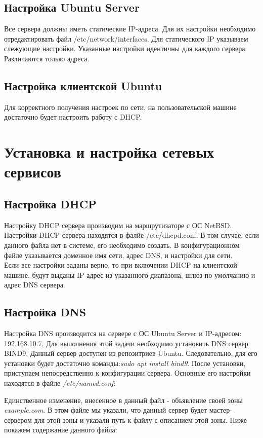 \subsection{Настройка Ubuntu Server}
Все сервера должны иметь статические IP-адреса. Для их настройки необходимо отредактировать файл /etc/network/interfaces. Для статического IP указываем слежующие настройки. Указанные настройки идентичны для каждого сервера. Различаются только адреса. 


\subsection{Настройка клиентской Ubuntu}
Для корректного получения настроек по сети, на пользовательской машине достаточно будет настроить работу с DHCP.


\section{Установка и настройка сетевых сервисов}
\subsection{Настройка DHCP}
Настройку DHCP сервера производим на маршрутизаторе с ОС NetBSD. Настройки DHCP сервера находятся в фалйе /etc/dhcpd.conf. В том случае, если данного файла нет в системе, его необходимо создать. В конфигурационном файле указывается доменное имя сети, адрес DNS, и настройки для сети.\\
Если все настройки заданы верно, то при включении DHCP на клиентской машине, будут выданы IP-адрес из указанного диапазона, шлюз по умолчанию и адрес DNS сервера.

\subsection{Настройка DNS}
Настройка DNS производится на сервере с ОС Ubuntu Server и IP-адресом: 192.168.10.7. Для выполнения этой задачи необходимо установить DNS сервер BIND9. Данный сервер доступен из репозитриев Ubuntu. Следовательно, для его установки будет достаточно команды:\textit{sudo apt install bind9}.
После установки, приступаем непосредственно к конфигурации сервера. Основные его настройки находятся в файле \textit{/etc/named.conf}:


Единственное изменение, внесенное в данный файл - объявление своей зоны \textit{example.com}. В этом файле мы указали, что данный сервер будет мастер-сервером для этой зоны и указали путь к файлу с описанием этой зоны. Ниже покажем содержание данного файла:


